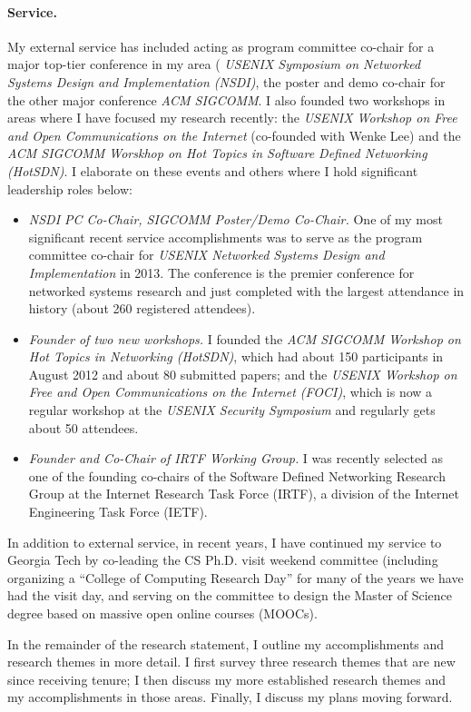 \paragraph{Service.}  My external service has included acting as program
committee co-chair for a major top-tier conference in my area ({\em
USENIX Symposium on Networked Systems Design and Implementation (NSDI)}, the
poster and demo co-chair for the other major conference {\em ACM
SIGCOMM}.  I also founded two workshops in areas where I have focused my
research recently: the {\em USENIX Workshop on Free and Open
Communications on the Internet} (co-founded with Wenke Lee) and the {\em
ACM SIGCOMM Worskhop on Hot Topics in Software Defined Networking
(HotSDN)}.  I elaborate on these events and others where I hold
significant leadership roles below:
\begin{itemize}
\item {\em NSDI PC Co-Chair, SIGCOMM Poster/Demo Co-Chair.} One of my
most significant recent service accomplishments was to serve 
as the program committee co-chair for {\em USENIX Networked Systems
Design and Implementation} in 2013.  The conference is the premier
conference for networked systems research and just completed with the
largest attendance in history (about 260 registered attendees).
\item {\em Founder of two new workshops.} I founded the {\em ACM SIGCOMM Workshop on
Hot Topics in Networking (HotSDN)}, which had about 150 participants in
August 2012 and about 80 submitted papers; and the {\em USENIX Workshop
on Free and Open Communications on the Internet (FOCI)}, which is now a
regular workshop at the {\em USENIX Security Symposium} and regularly
gets about 50 attendees.
\item {\em Founder and Co-Chair of IRTF Working Group.}  I was recently selected as one of the
founding co-chairs of the Software Defined Networking Research Group at
the Internet Research Task Force (IRTF), a division of the Internet
Engineering Task Force (IETF).
\end{itemize}
\noindent
In addition to external service, in recent years, I have continued my
service to Georgia Tech by co-leading the CS Ph.D. visit weekend
committee (including organizing a ``College of Computing Research Day''
for many of the years we have had the visit day, and serving on the
committee to design the Master of Science degree based on massive open
online courses (MOOCs).

\noindent
In the remainder of the research statement, I outline my accomplishments
and research themes in more detail.  I first survey three research
themes that are new since receiving tenure; I then discuss my more
established research themes and my accomplishments in those areas.
Finally, I discuss my plans moving forward.


